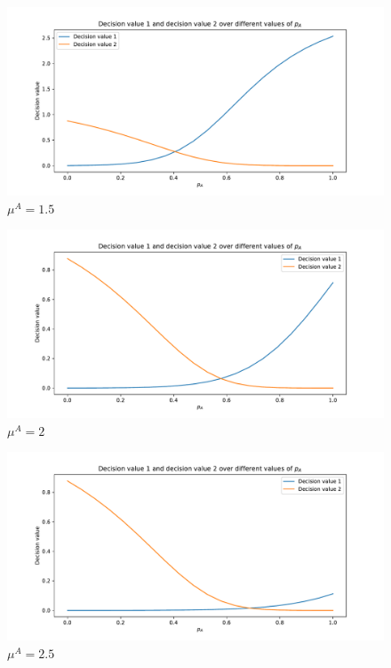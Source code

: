 \begin{figure}[H]
    \centering
    \includegraphics[width=\textwidth]{chapters/04_game_theoretic_model/img/brents_method/brent_method_example_mu_A_1.5.pdf}
    \caption{\(\mu^A = 1.5\)}
    \label{fig:brent_method_example_mu_A_2}
\end{figure}

\begin{figure}[H]
    \centering
    \includegraphics[width=\textwidth]{chapters/04_game_theoretic_model/img/brents_method/brent_method_example_mu_A_2.0.pdf}
    \caption{\(\mu^A = 2\)}
    \label{fig:brent_method_example_mu_A_3}
\end{figure}

\begin{figure}[H]
    \centering
    \includegraphics[width=\textwidth]{chapters/04_game_theoretic_model/img/brents_method/brent_method_example_mu_A_2.5.pdf}
    \caption{\(\mu^A = 2.5\)}
    \label{fig:brent_method_example_mu_A_4}
\end{figure}

